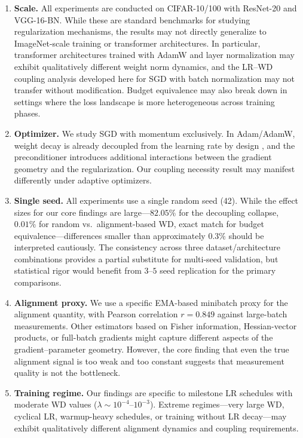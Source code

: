 \documentclass{article}
\begin{document}
\begin{enumerate}
  \item \textbf{Scale.}
        All experiments are conducted on CIFAR-10/100 with ResNet-20 and VGG-16-BN.
        While these are standard benchmarks for studying regularization mechanisms,
        the results may not directly generalize to ImageNet-scale training or
        transformer architectures.
        In particular, transformer architectures trained with AdamW and layer
        normalization may exhibit qualitatively different weight norm dynamics, and
        the LR--WD coupling analysis developed here for SGD with batch normalization
        may not transfer without modification.
        Budget equivalence may also break down in settings where the loss landscape
        is more heterogeneous across training phases.

  \item \textbf{Optimizer.}
        We study SGD with momentum exclusively.
        In Adam/AdamW, weight decay is already decoupled from the learning rate by
        design \citep{loshchilov2019decoupled}, and the preconditioner introduces
        additional interactions between the gradient geometry and the regularization.
        Our coupling necessity result may manifest differently under adaptive
        optimizers.

  \item \textbf{Single seed.}
        All experiments use a single random seed (42).
        While the effect sizes for our core findings are large---$82.05\%$ for the
        decoupling collapse, $0.01\%$ for random vs.\ alignment-based WD, exact match
        for budget equivalence---differences smaller than approximately $0.3\%$
        should be interpreted cautiously.
        The consistency across three dataset/architecture combinations provides a
        partial substitute for multi-seed validation, but statistical rigor would
        benefit from $3$--$5$ seed replication for the primary comparisons.

  \item \textbf{Alignment proxy.}
        We use a specific EMA-based minibatch proxy for the alignment quantity, with
        Pearson correlation $r = 0.849$ against large-batch measurements.
        Other estimators based on Fisher information, Hessian-vector products, or
        full-batch gradients might capture different aspects of the
        gradient--parameter geometry.
        However, the core finding that even the true alignment signal is too weak and
        too constant suggests that measurement quality is not the bottleneck.

  \item \textbf{Training regime.}
        Our findings are specific to milestone LR schedules with moderate WD values
        ($\lambda \sim 10^{-4}$--$10^{-3}$).
        Extreme regimes---very large WD, cyclical LR, warmup-heavy schedules, or
        training without LR decay---may exhibit qualitatively different alignment
        dynamics and coupling requirements.
\end{enumerate}
\end{document}
